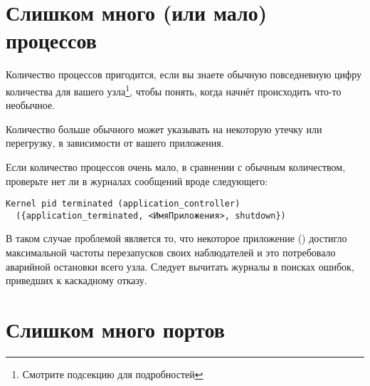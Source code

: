 \section{Слишком много (или мало) процессов}

Количество процессов пригодится, если вы знаете обычную повседневную цифру количества для вашего узла\footnote{Смотрите подсекцию  для подробностей}, чтобы понять, когда начнёт происходить что-то необычное.

Количество больше обычного может указывать на некоторую утечку или перегрузку, в зависимости от вашего приложения.

Если количество процессов очень мало, в сравнении с обычным количеством, проверьте нет ли в журналах сообщений вроде следующего:

\begin{Verbatim}
Kernel pid terminated (application_controller)
  ({application_terminated, <ИмяПриложения>, shutdown})
\end{Verbatim}

В таком случае проблемой является то, что некоторое приложение () достигло максимальной частоты перезапусков своих наблюдателей и это потребовало аварийной остановки всего узла. Следует вычитать журналы в поисках ошибок, приведших к каскадному отказу.


\section{Слишком много портов}

